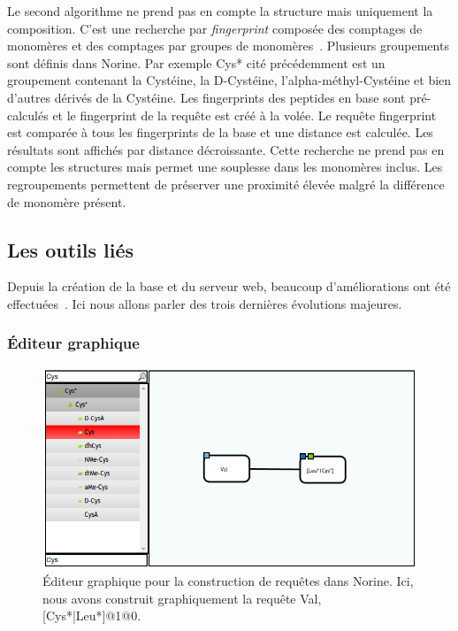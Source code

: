 Le second algorithme ne prend pas en compte la structure mais uniquement la composition.
C'est une recherche par \textit{fingerprint} composée des comptages de monomères et des comptages par groupes de monomères~\cite{abdo_new_2012}.
Plusieurs groupements sont définis dans Norine.
Par exemple Cys* cité précédemment est un groupement contenant la Cystéine, la D-Cystéine, l'alpha-méthyl-Cystéine et bien d'autres dérivés de la Cystéine.
Les fingerprints des peptides en base sont pré-calculés et le fingerprint de la requête est créé à la volée.
Le requête fingerprint est comparée à tous les fingerprints de la base et une distance est calculée.
Les résultats sont affichés par distance décroissante.
Cette recherche ne prend pas en compte les structures mais permet une souplesse dans les monomères inclus.
Les regroupements permettent de préserver une proximité élevée malgré la différence de monomère présent.



\subsection{Les outils liés}

Depuis la création de la base et du serveur web, beaucoup d'améliorations ont été effectuées~\cite{flissi_norine_2016}.
Ici nous allons parler des trois dernières évolutions majeures.


\subsubsection{Éditeur graphique}

\begin{figure}[h!]
  \begin{center}
    \includegraphics[width=450px]{Figures/Norine/editor.png}
    \caption{\label{editor}Éditeur graphique pour la construction de requêtes dans Norine.
    Ici, nous avons construit graphiquement la requête Val,[Cys*|Leu*]@1@0.}
  \end{center}
\end{figure}

